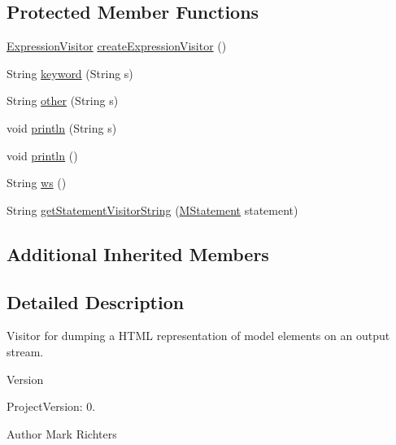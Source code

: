 \subsection*{Protected Member Functions}
\begin{DoxyCompactItemize}
\item 
\hyperlink{interfaceorg_1_1tzi_1_1use_1_1uml_1_1ocl_1_1expr_1_1_expression_visitor}{Expression\-Visitor} \hyperlink{classorg_1_1tzi_1_1use_1_1gui_1_1util_1_1_m_m_h_t_m_l_print_visitor_a90642709d24faf4206b0ddbf6e3efa57}{create\-Expression\-Visitor} ()
\item 
String \hyperlink{classorg_1_1tzi_1_1use_1_1gui_1_1util_1_1_m_m_h_t_m_l_print_visitor_a2d1dbbdf8d2cb71fdf9bead41b012976}{keyword} (String s)
\item 
String \hyperlink{classorg_1_1tzi_1_1use_1_1gui_1_1util_1_1_m_m_h_t_m_l_print_visitor_aa2be57407dd1bf85e17379d4c713cfb0}{other} (String s)
\item 
void \hyperlink{classorg_1_1tzi_1_1use_1_1gui_1_1util_1_1_m_m_h_t_m_l_print_visitor_a7aa7acd11db2f1e12dc96679834c63cc}{println} (String s)
\item 
void \hyperlink{classorg_1_1tzi_1_1use_1_1gui_1_1util_1_1_m_m_h_t_m_l_print_visitor_af66093fa6f19f331c15519d35c462acf}{println} ()
\item 
String \hyperlink{classorg_1_1tzi_1_1use_1_1gui_1_1util_1_1_m_m_h_t_m_l_print_visitor_a13cb5c2655003ff4440dc56d4f7c7670}{ws} ()
\item 
String \hyperlink{classorg_1_1tzi_1_1use_1_1gui_1_1util_1_1_m_m_h_t_m_l_print_visitor_ae9c2363ee198c3932afa1e02e5cd0ebf}{get\-Statement\-Visitor\-String} (\hyperlink{classorg_1_1tzi_1_1use_1_1uml_1_1sys_1_1soil_1_1_m_statement}{M\-Statement} statement)
\end{DoxyCompactItemize}
\subsection*{Additional Inherited Members}


\subsection{Detailed Description}
Visitor for dumping a H\-T\-M\-L representation of model elements on an output stream.

\begin{DoxyVersion}{Version}

\end{DoxyVersion}
\begin{DoxyParagraph}{Project\-Version\-:}
0. 
\end{DoxyParagraph}
\begin{DoxyAuthor}{Author}
Mark Richters 
\end{DoxyAuthor}


